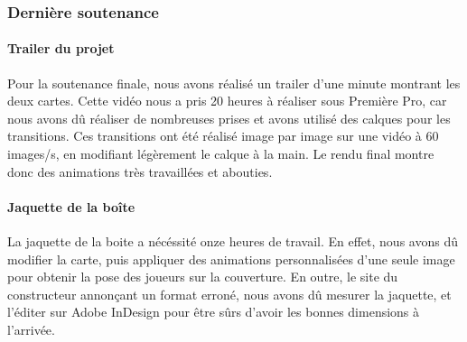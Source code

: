     \vspace{0.5cm}
    \subsubsection{Dernière soutenance}
    \vspace{0.5cm}

        \paragraph{Trailer du projet}

        Pour la soutenance finale, nous avons réalisé un trailer d'une minute montrant les deux cartes. Cette vidéo nous a pris 
        20 heures à réaliser sous Première Pro, car nous avons dû réaliser de nombreuses prises et avons utilisé des calques 
        pour les transitions. Ces transitions ont été réalisé image par image sur une vidéo à 60 images/s, en modifiant légèrement 
        le calque à la main. Le rendu final montre donc des animations très travaillées et abouties.

        \paragraph{Jaquette de la boîte}

        La jaquette de la boite a nécéssité onze heures de travail. En effet, nous avons 
        dû modifier la carte, puis appliquer des animations personnalisées d'une seule image 
        pour obtenir la pose des joueurs sur la couverture. En outre, le site du constructeur 
        annonçant un format erroné, nous avons dû mesurer la jaquette, et l'éditer sur Adobe InDesign pour 
        être sûrs d'avoir les bonnes dimensions à l'arrivée.